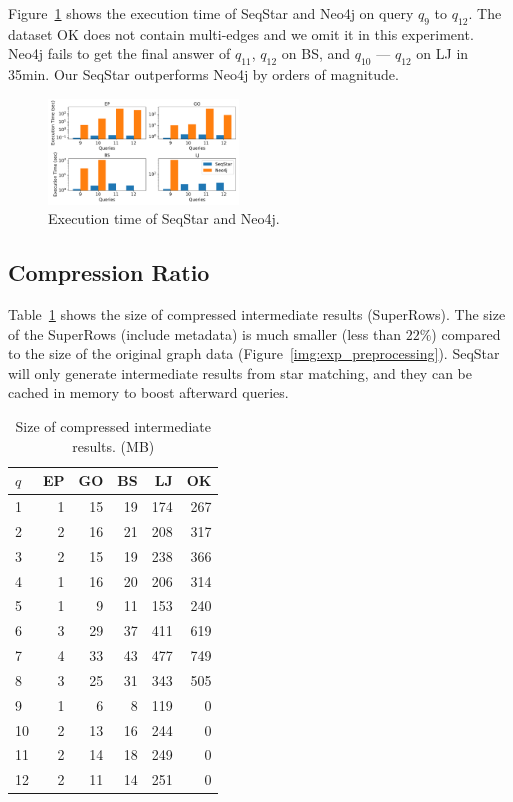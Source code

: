 Figure~\ref{img:exp_compare_neo4j} shows the execution time of SeqStar and Neo4j on query $q_9$ to $q_{12}$.
The dataset OK does not contain multi-edges and we omit it in this experiment.
Neo4j fails to get the final answer of $q_{11}$, $q_{12}$ on BS, and $q_{10}$ --- $q_{12}$ on LJ in 35min.
Our SeqStar outperforms Neo4j by orders of magnitude.
\begin{figure}[ht]
  \centering
  \includegraphics[width=0.45\textwidth]{img/exp_compare_neo4j.pdf}
  \caption{Execution time of SeqStar and Neo4j.}\label{img:exp_compare_neo4j}
\end{figure}
\subsection{Compression Ratio}\label{sec:experiments_compress}
Table~\ref{tab:compressed} shows the size of compressed intermediate results (SuperRows).
The size of the SuperRows (include metadata) is much smaller (less than $22\%$) compared to the size of the original graph data (Figure~\ref{img:exp_preprocessing}).
SeqStar will only generate intermediate results from star matching,
and they can be cached in memory to boost afterward queries.

\begin{table}
  \caption{Size of compressed intermediate results. (MB)}\label{tab:compressed}
  \begin{tabular}{lrrrrr}
    \toprule
    $q$ &  EP &  GO &  BS &  LJ &  OK \\
    \midrule
    1  &   1 &  15 &  19 & 174 & 267 \\
    2  &   2 &  16 &  21 & 208 & 317 \\
    3  &   2 &  15 &  19 & 238 & 366 \\
    4  &   1 &  16 &  20 & 206 & 314 \\
    5  &   1 &   9 &  11 & 153 & 240 \\
    6  &   3 &  29 &  37 & 411 & 619 \\
    7  &   4 &  33 &  43 & 477 & 749 \\
    8  &   3 &  25 &  31 & 343 & 505 \\
    9  &   1 &   6 &   8 & 119 & 0 \\
    10 &   2 &  13 &  16 & 244 & 0 \\
    11 &   2 &  14 &  18 & 249 & 0 \\
    12 &   2 &  11 &  14 & 251 & 0 \\
    \bottomrule
  \end{tabular}
\end{table}

